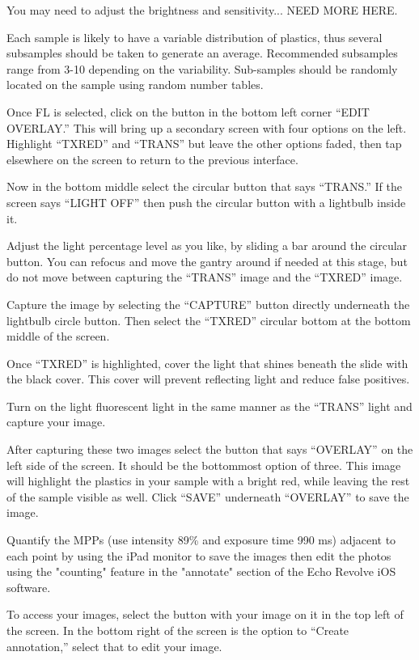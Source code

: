 \documentclass[12pt]{../SOP4_alpha}\usepackage[]{graphicx}\usepackage[]{color}
\begin{document}
\NP You may need to adjust the brightness and sensitivity... NEED MORE HERE.

\NP Each sample is likely to have a variable distribution of plastics, thus several subsamples should be taken to generate an average. Recommended subsamples range from 3-10 depending on the variability. Sub-samples should be randomly located on the sample using random number tables. 

\NP Once FL is selected, click on the button in the bottom left corner ``EDIT OVERLAY.'' This will bring up a secondary screen with four options on the left. Highlight ``TXRED'' and “TRANS” but leave the other options faded, then tap elsewhere on the screen to return to the previous interface.

\NP Now in the bottom middle select the circular button that says ``TRANS.'' If the screen says ``LIGHT OFF'' then push the circular button with a lightbulb inside it. 

\NP Adjust the light percentage level as you like, by sliding a bar around the circular button. You can refocus and move the gantry around if needed at this stage, but do not move between capturing the ``TRANS'' image and the ``TXRED'' image. 

\NP Capture the image by selecting the ``CAPTURE'' button directly underneath the lightbulb circle button. Then select the ``TXRED'' circular bottom at the bottom middle of the screen.

\NP Once ``TXRED'' is highlighted, cover the light that shines beneath the slide with the black cover. This cover will prevent reflecting light and reduce false positives. 

\NP Turn on the light fluorescent light in the same manner as the ``TRANS'' light and capture your image. 

\NP After capturing these two images select the button that says ``OVERLAY'' on the left side of the screen. It should be the bottommost option of three. This image will highlight the plastics in your sample with a bright red, while leaving the rest of the sample visible as well. Click ``SAVE'' underneath ``OVERLAY'' to save the image.

\NP Quantify the MPPs (use intensity 89\% and exposure time 990 ms) adjacent to each point by using the iPad monitor to save the images then edit the photos using the "counting" feature in the "annotate" section of the Echo Revolve iOS software.

\NP To access your images, select the button with your image on it in the top left of the screen. In the bottom right of the screen is the option to ``Create annotation,'' select that to edit your image. 
\end{document}
